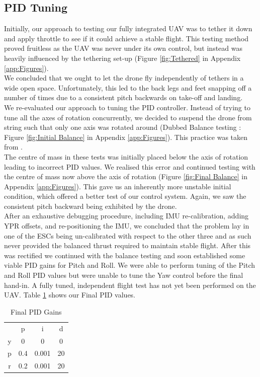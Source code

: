 \documentclass[a4paper,11pt]{article}
\begin{document}
\subsection{PID Tuning}
Initially, our approach to testing our fully integrated UAV was to tether it down and apply throttle to see if it could achieve a stable flight. This testing method proved fruitless as the UAV was never under its own control, but instead was heavily influenced by the tethering set-up (Figure \ref{fig:Tethered} in Appendix \ref{app:Figures}).\\
We concluded that we ought to let the drone fly independently of tethers in a wide open space. Unfortunately, this led to the back legs and feet snapping off a number of times due to a consistent pitch backwards on take-off and landing.\\ 
We re-evaluated our approach to tuning the PID controller. Instead of trying to tune all the axes of rotation concurrently, we decided to suspend the drone from string such that only one axis was rotated around (Dubbed Balance testing : Figure \ref{fig:Initial Balance} in Appendix \ref{app:Figures}). This practice was taken from \cite{How to recognise incorrect PI Gains}.\\
The centre of mass in these tests was initially placed below the axis of rotation leading to incorrect PID values. We realised this error and continued testing with the centre of mass now above the axis of rotation (Figure \ref{fig:Final Balance} in Appendix \ref{app:Figures}). This gave us an inherently more unstable initial condition, which offered a better test of our control system. Again, we saw the consistent pitch backward being exhibited by the drone.\\ After an exhaustive debugging procedure, including IMU re-calibration, adding YPR offsets, and re-positioning the IMU, we concluded that the problem lay in one of the ESCs being un-calibrated with respect to the other three and as such never provided the balanced thrust required to maintain stable flight. After this was rectified we continued with the balance testing and soon established some viable PID gains for Pitch and Roll.
We were able to perform tuning of the Pitch and Roll PID values but were unable to tune the Yaw control before the final hand-in. A fully tuned, independent flight test has not yet been performed on the UAV.
Table \ref{tab:Final PID values} shows our Final PID values.
\begin{table}[!htp]
    \centering
    \begin{tabular}{c|c|c|c}
     & p & i & d\\
    y & 0 & 0 & 0   \\
    p & 0.4 & 0.001 & 20  \\
    r & 0.2 & 0.001 & 20
       
    \end{tabular}
    \caption{Final PID Gains}
    \label{tab:Final PID values}
\end{table}
    
\end{document}
